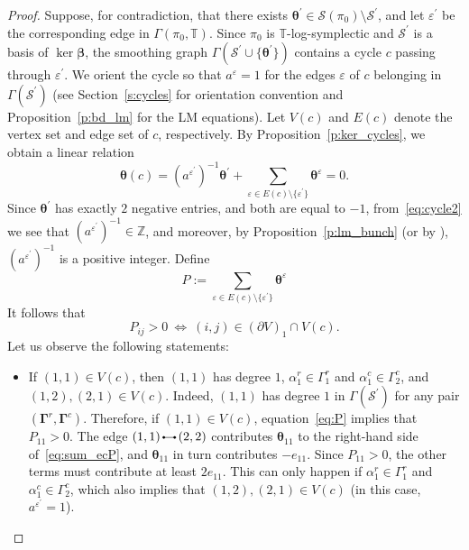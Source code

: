 \documentclass[11pt]{article}
\newcommand{\bbeta}{\boldsymbol{\beta}}
\newcommand{\btheta}{{\boldsymbol{\theta}}}
\newcommand{\bg}{\mathbf{\Gamma}}
\theoremstyle{definition}\newtheorem{definition}[theorem]{Definition}
\theoremstyle{definition}\newtheorem{remark}[theorem]{Remark}
\theoremstyle{remark}
\numberwithin{equation}{section}
\newcommand{\edge}{\,
	\begin{tikzpicture}
		\draw (0,.5ex) -- (2ex,.5ex);
		\draw[fill] (0,.5ex) circle (.2ex);
		\draw[fill] (2ex,.5ex) circle (.2ex);
		\draw[fill] (0,0) circle (0);
	\end{tikzpicture}\,
}
\begin{document}
\begin{proof}
    Suppose, for contradiction, that there exists $\btheta^\prime \in \mathcal{S}(\pi_0)\setminus \mathcal{S}^\prime$, and let $\varepsilon^\prime$ be the corresponding edge in $\Gamma(\pi_0,\mathbb{T})$. Since $\pi_0$ is $\mathbb{T}$-log-symplectic and $\mathcal{S}^\prime$ is a basis of $\ker \bbeta$, the smoothing graph $\Gamma(\mathcal{S}^\prime\cup\{\btheta^\prime\})$ contains a cycle $c$ passing through $\varepsilon^\prime$. We orient the cycle so that $a^{\varepsilon} = 1$ for the edges $\varepsilon$ of $c$ belonging in $\Gamma(\mathcal{S}^\prime)$ (see Section~\ref{s:cycles} for orientation convention and Proposition~\ref{p:bd_lm} for the LM equations). Let $V(c)$ and $E(c)$ denote the vertex set and edge set of $c$, respectively. By Proposition~\ref{p:ker_cycles}, we obtain a linear relation
    \begin{equation}\label{eq:cycle2}
        \btheta(c) = (a^{\varepsilon^\prime})^{-1}\btheta^\prime + \sum_{\varepsilon \in E(c)\setminus\{\varepsilon^\prime\}} \btheta^\varepsilon = 0.
    \end{equation}
    Since $\btheta^\prime$ has exactly $2$ negative entries, and both are equal to $-1$, from~\eqref{eq:cycle2} we see that $(a^{\varepsilon^\prime})^{-1} \in \mathbb{Z}$, and moreover, by Proposition~\ref{p:lm_bunch} (or by \cite[Lemma 2.2.9]{lm-deform}), $(a^{\varepsilon^\prime})^{-1}$ is a positive integer. Define
    \begin{equation}\label{eq:sum_ecP}
        P:=\sum_{\varepsilon \in E(c)\setminus\{\varepsilon^\prime\}} \btheta^\varepsilon
    \end{equation}
    It follows that 
    \begin{equation}\label{eq:P}
        P_{ij} > 0 \ \Leftrightarrow \ (i,j) \in (\partial V)_1 \cap V(c).
    \end{equation}
    Let us observe the following statements:
    \begin{itemize}
        \item If $(1,1) \in V(c)$, then $(1,1)$ has degree $1$, $\alpha_1^r \in \Gamma_1^r$ and $\alpha_1^c \in \Gamma_2^c$, and $(1,2),(2,1) \in V(c)$. Indeed, $(1,1)$ has degree $1$ in $\Gamma(\mathcal{S}^\prime)$ for any pair $(\bg^r,\bg^c)$. Therefore, if $(1,1) \in V(c)$, equation~\eqref{eq:P} implies that $P_{11} > 0$. The edge $(1,1)\edge (2,2)$ contributes $\btheta_{11}$ to the right-hand side of~\eqref{eq:sum_ecP}, and $\btheta_{11}$ in turn contributes $-e_{11}$. Since $P_{11} > 0$, the other terms must contribute at least $2e_{11}$. This can only happen if $\alpha_1^r \in \Gamma_1^r$ and $\alpha_1^c \in \Gamma_2^c$, which also implies that $(1,2),(2,1) \in V(c)$ (in this case, $a^{\varepsilon^\prime}= 1$).

\end{itemize}
\end{proof}
\end{document}
